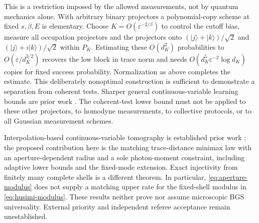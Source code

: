 This is a restriction imposed by the allowed measurements, not by quantum
mechanics alone. With arbitrary binary projectors a polynomial-copy scheme
at fixed $s,\beta,E$ is elementary. Choose
$K=O(\varepsilon^{-2/\beta})$ to control the cutoff bias, measure all
occupation projectors and the projectors onto
$(|j\rangle+|k\rangle)/\sqrt2$ and
$(|j\rangle+i|k\rangle)/\sqrt2$ within $P_K$.
Estimating these $O(d_K^2)$ probabilities to
$O(\varepsilon/d_K^{3/2})$ recovers the low block in trace norm and needs
$O(d_K^5\varepsilon^{-2}\log d_K)$ copies for fixed success probability.
Normalization as above completes the estimate. This deliberately nonoptimal
construction is sufficient to demonstrate a separation from coherent tests.
Sharper general continuous-variable learning bounds are prior work
\cite{Mele2025}. The coherent-test lower bound must not be applied to these
other projectors, to homodyne measurements, to collective protocols, or to
all Gaussian measurement schemes.

Interpolation-based continuous-variable tomography is established prior work
\cite{LGC2018}; the proposed contribution here is the matching trace-distance
minimax law with an aperture-dependent radius and a sole photon-moment
constraint, including adaptive lower bounds and the fixed-mode extension.
Exact injectivity from finitely many complete shells is a different theorem.
In particular, \eqref{eq:aperture-modulus} does not supply a matching upper
rate for the fixed-shell modulus in \eqref{eq:husimi-modulus}.
These results neither prove nor assume microscopic BGS universality.
External priority and independent referee acceptance remain unestablished.
